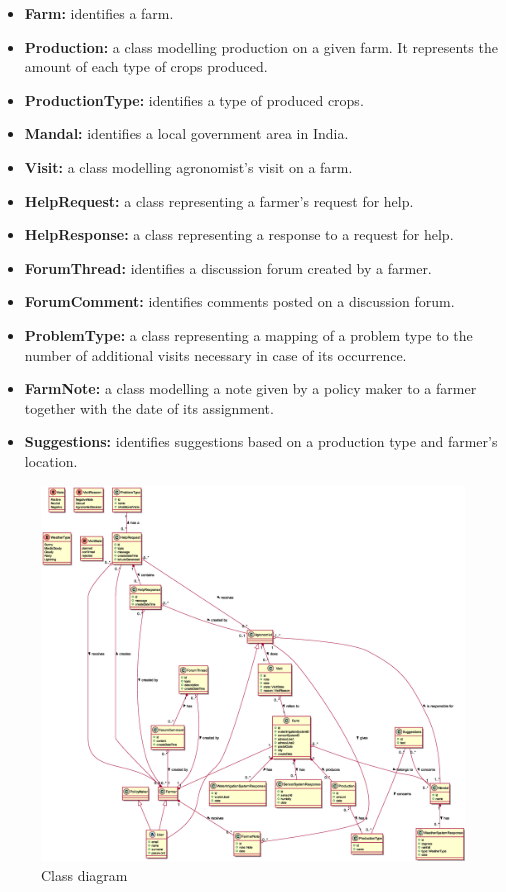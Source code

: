 \begin{itemize}
    \begin{itemize}
        \item \textbf{Farm:} identifies a farm.
        \item \textbf{Production:} a class modelling production on a given farm. It represents the amount of each type of crops produced. 
        \item \textbf{ProductionType:} identifies a type of produced crops.
        \item \textbf{Mandal:} identifies a local government area in India.
        \item \textbf{Visit:} a class modelling agronomist's visit on a farm.
        \item \textbf{HelpRequest:} a class representing a farmer's request for help.
        \item \textbf{HelpResponse:} a class representing a response to a request for help.
        \item \textbf{ForumThread:} identifies a discussion forum created by a farmer.
        \item \textbf{ForumComment:} identifies comments posted on a discussion forum.
        \item \textbf{ProblemType:} a class representing a mapping of a problem type to the number of additional visits necessary in case of its occurrence.
        \item \textbf{FarmNote:} a class modelling a note given by a policy maker to a farmer together with the date of its assignment.
        \item \textbf{Suggestions:} identifies suggestions based on a production type and farmer's location.
    \end{itemize}
\end{itemize}

\begin{figure}[H]
    \centering
    \includegraphics[width=\textwidth, height=0.98\textheight, keepaspectratio, origin=c]{diagrams/class}
    \caption{Class diagram}
    \label{fig:class_diagram}
\end{figure}


